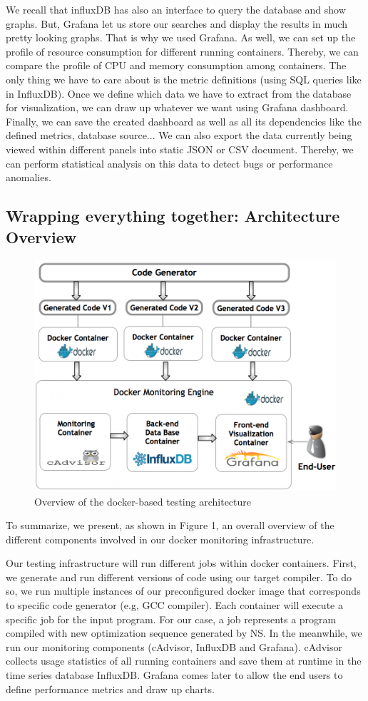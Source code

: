 We recall that influxDB has also an interface to query the database and show graphs. But, Grafana let us store our searches and display the results in much pretty looking graphs. That is why we used Grafana.
As well, we can set up the profile of resource consumption for different running
containers. Thereby, we can compare the profile of CPU and memory consumption among containers. The only thing we have to care about is the metric definitions (using SQL queries like in InfluxDB). Once we define which data we have to extract from the database for visualization, we can draw up whatever we want using Grafana dashboard. Finally, we can save the created dashboard as well as all its dependencies like the defined metrics, database source... We can also export the data currently being viewed within different
panels into static JSON or CSV document. Thereby, we can perform statistical analysis on this data to detect bugs or performance anomalies.

\subsection{Wrapping everything together: Architecture Overview}
\begin{figure}[b!]
	\includegraphics[scale=0.48]{Ressources/infra.png}
	\caption{Overview of the docker-based testing architecture}
\end{figure}

To summarize, we present, as shown in Figure 1, an overall overview of the different components involved in our docker monitoring infrastructure.

Our testing infrastructure will run different jobs within docker containers. First, we generate and run different versions of code using our target compiler. To do so, we run multiple instances of our preconfigured docker image that corresponds to specific code generator (e.g, GCC compiler). Each container will execute a specific job for the input program. For our case, a job represents a program compiled with new optimization sequence generated by NS. In the meanwhile, we run our monitoring components (cAdvisor, InfluxDB and Grafana). cAdvisor collects usage statistics of all running containers and save them at runtime in the time series database InfluxDB. Grafana comes later to allow the end users to define performance metrics and draw up charts.
